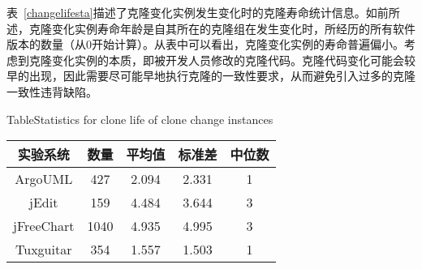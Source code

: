 表~\ref{changelifesta}描述了克隆变化实例发生变化时的克隆寿命统计信息。如前所述，克隆变化实例寿命年龄是自其所在的克隆组在发生变化时，所经历的所有软件版本的数量（从$0$开始计算）。从表中可以看出，克隆变化实例的寿命普遍偏小。考虑到克隆变化实例的本质，即被开发人员修改的克隆代码。克隆代码变化可能会较早的出现，因此需要尽可能早地执行克隆的一致性要求，从而避免引入过多的克隆一致性违背缺陷。

\begin{table}[htbp]
{Table$\!$}{Statistics for clone life of clone change instances}
\vspace{0.5em}
\centering
\wuhao
\begin{tabular}{ccccc}
\toprule[1.5pt]
{实验系统}&{数量}&{平均值}&{标准差}&{中位数}\\ 
\midrule[1pt]
ArgoUML&427&2.094&2.331&1\\ 
jEdit&159&4.484&3.644&3\\ 
jFreeChart&1040&4.935&4.995&3\\ 
Tuxguitar&354&1.557&1.503&1\\ 
\bottomrule[1.5pt]
\end{tabular}
\end{table}



